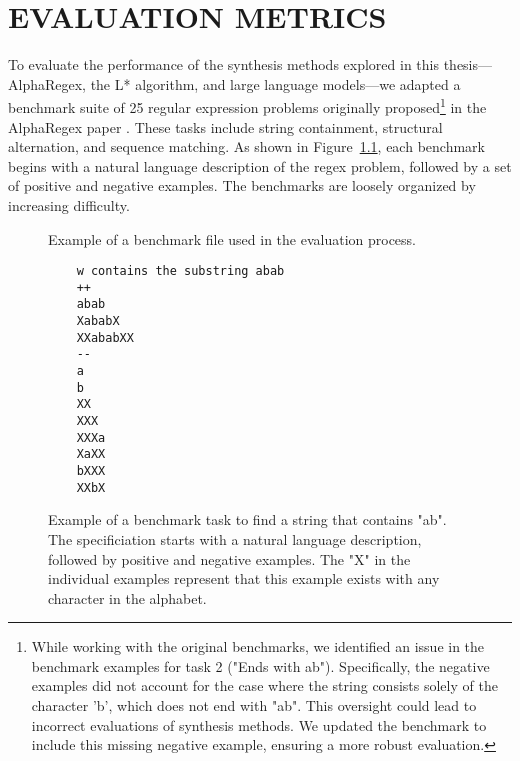 %
%
%


\chapter{EVALUATION METRICS}


\renewcommand*{\thefootnote}{\fnsymbol{footnote}}

\indent\indent To evaluate the performance of the synthesis methods explored in this thesis—AlphaRegex, the L* algorithm, and large language models—we adapted a benchmark suite of 25 regular expression problems originally proposed\footnote{While working with the original benchmarks, we identified an issue in the benchmark examples for task 2 ("Ends with ab"). Specifically, the negative examples did not account for the case where the string consists solely of the character 'b', which does not end with "ab". This oversight could lead to incorrect evaluations of synthesis methods. We updated the benchmark to include this missing negative example, ensuring a more robust evaluation.} in the AlphaRegex paper \cite{lee_2016_synthesizing}. These tasks include string containment, structural alternation, and sequence matching. As shown in Figure~\ref{fig:benchmark-example}, each benchmark begins with a natural language description of the regex problem, followed by a set of positive and negative examples. The benchmarks are loosely organized by increasing difficulty.

\begin{figure}[h!]
	\centering
	Example of a benchmark file used in the evaluation process.
	\begin{verbatim}
	w contains the substring abab
	++
	abab
	XababX
	XXababXX
	--
	a
	b
	XX
	XXX
	XXXa
	XaXX
	bXXX
	XXbX
	\end{verbatim}
	\captionsetup{justification=centering}
	\caption{Example of a benchmark task to find a string that contains "ab". The specificiation starts with a natural language description, followed by positive and negative examples. The "X" in the individual examples represent that this example exists with any character in the alphabet.}
	\label{fig:benchmark-example}
\end{figure}

